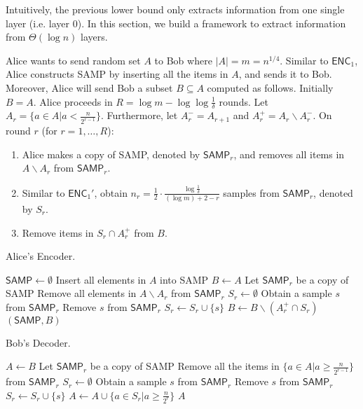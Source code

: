 \documentclass[10pt]{article}
\newcommand{\samp}{\textsf{SAMP}\xspace}
\newcommand{\enc}{\textsf{ENC}\xspace}
\newcommand{\dec}{\textsf{DEC}\xspace}
\begin{document}
Intuitively, the previous lower bound only extracts information from one single layer (i.e. layer $0$). In this section, we build a framework to extract information from $\Theta(\log n)$ layers. 

Alice wants to send random set $A$ to Bob where $|A|=m=n^{1/4}$. Similar to $\enc_1$, Alice constructs \samp by inserting all the items in $A$, and sends it to Bob. Moreover, Alice will send Bob a subset $B\subseteq A$ computed as follows. Initially $B=A$. Alice proceeds in $R=\log m - \log\log \frac{1}{\delta}$ rounds. Let $A_r = \{a\in A|a<\frac{n}{2^{r-1}}\}$. Furthermore, let $A_r^{-}=A_{r+1}$ and $A_r^{+}=A_r \backslash A_r^{-}$. On round $r$ (for $r=1,\ldots,R$):

\begin{enumerate}
\item Alice makes a copy of \samp, denoted by $\samp_r$, and removes all items in $A\backslash A_r$ from $\samp_r$.  
\item Similar to $\enc_1'$, obtain $n_r=\frac{1}{2}\cdot \frac{\log \frac{1}{\delta}}{(\log m)+2-r}$ samples from $\samp_r$, denoted by $S_r$. 
\item Remove items in $S_r\cap A_r^{+}$ from $B$.
\end{enumerate}

\begin{algorithm}[H]
  \caption{Alice's Encoder.}
  \begin{algorithmic}[1]
    \Procedure{$\enc_2$}{$A$}
    \State $\samp \leftarrow \emptyset$
    \State Insert all elements in $A$ into \samp
    \State $B\leftarrow A$
      \State Let $\samp_r$ be a copy of \samp
      \State Remove all elements in $A\backslash A_r$ from $\samp_r$
      \State $S_r\leftarrow \emptyset$
        \State Obtain a sample $s$ from $\samp_r$
        \State Remove $s$ from $\samp_r$
        \State $S_r\leftarrow S_r \cup \{s\}$
      \EndFor
      \State $B \leftarrow B \backslash (A_r^{+}\cap S_r)$
    \EndFor
    \State \Return $(\samp, B)$ 
    \EndProcedure
  \end{algorithmic}
\end{algorithm}

\begin{algorithm}[H]
  \caption{Bob's Decoder.}
  \begin{algorithmic}[1]
    \Procedure{$\dec_2$}{\samp, $B$}
    \State $A\leftarrow B$
      \State Let $\samp_r$ be a copy of \samp 
      \State Remove all the items in $\{a\in A|a\ge \frac{n}{2^{r-1}}\}$ from $\samp_r$
      \State $S_r\leftarrow \emptyset$
      \State Obtain a sample $s$ from $\samp_r$
      \State Remove $s$ from $\samp_r$
      \State $S_r\leftarrow S_r \cup \{s\}$
      \EndFor
      \State $A \leftarrow A \cup \{a\in S_r|a \ge \frac{n}{2^r}\}$
    \EndFor
    \State \Return $A$ 
    \EndProcedure
  \end{algorithmic}
\end{algorithm}
\end{document}
